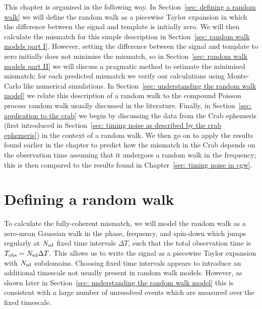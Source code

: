 \documentclass[../full_thesis/full_thesis.tex]{subfiles}
\begin{document}
This chapter is organised in the following way. In Section~\ref{sec: defining a
random walk} we will define the random walk as a piecewise Taylor expansion in
which the difference between the signal and template is initially zero. We will
then calculate the mismatch for this simple description in Section~\ref{sec:
random walk models part I}. However, setting the difference between the signal
and template to zero initially does not minimise the mismatch, so in
Section~\ref{sec: random walk models part II} we will discuss a pragmatic
method to estimate the minimised mismatch; for each predicted mismatch we
verify our calculations using Monte-Carlo like numerical simulations. In
Section~\ref{sec: understanding the random walk model} we relate this
description of a random walk to the compound Poisson process random walk
usually discussed in the literature.  Finally, in Section~\ref{sec: application
to the crab} we begin by discussing the data from the Crab ephemeris (first
introduced in Section~\ref{sec: timing noise as described by the crab
ephemeris}) in the context of a random walk.  We then go on to apply the
results found earlier in the chapter to predict how the mismatch in the Crab
depends on the observation time assuming that it undergoes a random walk in the
frequency; this is then compared to the results found in Chapter~\ref{sec:
timing noise in cgw}.

\section{Defining a random walk}
\label{sec: defining a random walk}
To calculate the fully-coherent mismatch, we will model the random walk as a
zero-mean Gaussian walk in the phase, frequency, and spin-down which jumps
regularly at $N_{\textrm{sd}}$ fixed time intervals $\Delta T$, such that the total
observation time is $T_{\mathrm{obs}} = N_{\textrm{sd}} \Delta T$.  This allows us to write the
signal as a piecewise Taylor expansion with $N_{\textrm{sd}}$ subdomains. Choosing fixed time
intervals appears to introduce an additional timescale not usually present in
random walk models.  However, as shown later in Section~\ref{sec: understanding
the random walk model} this is consistent with a large number of unresolved
events which are measured over the fixed timescale.
\end{document}
